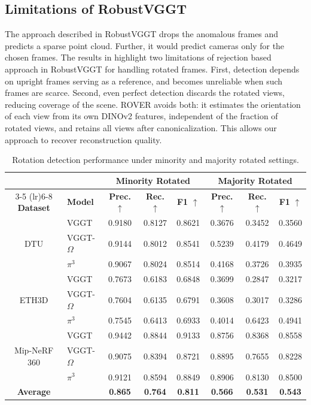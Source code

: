\subsection{Limitations of RobustVGGT}
The approach described in RobustVGGT drops the anomalous frames and predicts a sparse point cloud. Further, it would predict cameras only for the chosen frames. The results in  highlight two limitations of rejection based approach in RobustVGGT for handling rotated frames. First, detection depends on upright frames serving as a reference, and becomes unreliable when such frames are scarce. Second, even perfect detection discards the rotated views, reducing coverage of the scene. ROVER avoids both: it estimates the orientation of each view from its own DINOv2 features, independent of the fraction of rotated views, and retains all views after canonicalization. This allows our approach to recover reconstruction quality.

\begin{table}[h]
\centering
\caption{Rotation detection performance under minority and majority rotated settings.}
\label{tab:rotation-prior}

\setlength{\tabcolsep}{3.5pt}
\renewcommand{\arraystretch}{0.95}

{\scriptsize
\begin{tabular}{c l ccc ccc}
\toprule
& & \multicolumn{3}{c}{\textbf{Minority Rotated}} & \multicolumn{3}{c}{\textbf{Majority Rotated}} \\
\cmidrule(lr){3-5} \cmidrule(lr){6-8}
\textbf{Dataset} & \textbf{Model} & \textbf{Prec.} $\uparrow$ & \textbf{Rec.} $\uparrow$ & \textbf{F1} $\uparrow$ & \textbf{Prec.} $\uparrow$ & \textbf{Rec.} $\uparrow$ & \textbf{F1} $\uparrow$ \\
\midrule
\multirow{3}{*}{DTU}
& VGGT          & 0.9180 & 0.8127 & 0.8621 & 0.3676 & 0.3452 & 0.3560 \\
& VGGT-$\Omega$ & 0.9144 & 0.8012 & 0.8541 & 0.5239 & 0.4179 & 0.4649 \\
& $\pi^3$           & 0.9067 & 0.8024 & 0.8514 & 0.4168 & 0.3726 & 0.3935 \\
\midrule
\multirow{3}{*}{ETH3D}
& VGGT          & 0.7673 & 0.6183 & 0.6848 & 0.3699 & 0.2847 & 0.3217 \\
& VGGT-$\Omega$ & 0.7604 & 0.6135 & 0.6791 & 0.3608 & 0.3017 & 0.3286 \\
& $\pi^3$           & 0.7545 & 0.6413 & 0.6933 & 0.4014 & 0.6423 & 0.4941 \\
\midrule
\multirow{3}{*}{Mip-NeRF 360}
& VGGT          & 0.9442 & 0.8844 & 0.9133 & 0.8756 & 0.8368 & 0.8558 \\
& VGGT-$\Omega$ & 0.9075 & 0.8394 & 0.8721 & 0.8895 & 0.7655 & 0.8228 \\
& $\pi^3$           & 0.9121 & 0.8594 & 0.8849 & 0.8906 & 0.8130 & 0.8500 \\
\midrule
\textbf{Average} & & \textbf{0.865} & \textbf{0.764} & \textbf{0.811} & \textbf{0.566} & \textbf{0.531} & \textbf{0.543} \\
\bottomrule
\end{tabular}
}
\end{table}


